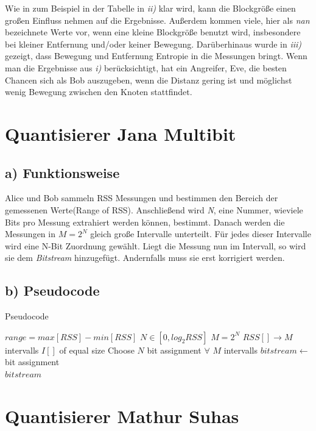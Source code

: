 \documentclass[12pt,a4paper]{article}
\begin{document}
Wie in zum Beispiel in der Tabelle in \textit{ii)} klar wird, kann die 
Blockgröße einen großen Einfluss nehmen auf die Ergebnisse. Außerdem 
kommen viele, hier als \textit{nan} bezeichnete Werte vor, wenn
eine kleine Blockgröße benutzt wird, insbesondere bei kleiner 
Entfernung und/oder keiner Bewegung. 
Darüberhinaus wurde in \textit{iii)} gezeigt, dass Bewegung und
Entfernung Entropie in die Messungen bringt. Wenn man die Ergebnisse
aus \textit{i)} berücksichtigt, hat ein Angreifer, Eve, die besten 
Chancen sich als Bob auszugeben, wenn die Distanz gering ist und 
möglichst wenig Bewegung zwischen den Knoten stattfindet.

\newpage
\section{Quantisierer Jana Multibit}
\subsection*{a) Funktionsweise}
Alice und Bob sammeln RSS Messungen und bestimmen den Bereich der gemessenen Werte(Range of RSS). Anschließend wird \textit{N}, eine Nummer, wieviele Bits pro Messung extrahiert werden können, bestimmt. Danach werden die Messungen in $M = 2^N$ gleich große Intervalle unterteilt. Für jedes dieser Intervalle wird eine N-Bit Zuordnung gewählt. Liegt die Messung nun im Intervall, so wird sie dem \textit{Bitstream} hinzugefügt. Andernfalls muss sie erst korrigiert werden.

\subsection*{b) Pseudocode}
\begin{algorithm}
\caption{Pseudocode}
\begin{algorithmic}[1]
\State $range = max[RSS] - min[RSS]$
\State $N \in [0, log_2 RSS]$
\State $M = 2^N$
\State $RSS[] \to M$ intervalls $I[]$ of equal size
\State Choose $N$ bit assignment $\forall$ $M$ intervalls
\State $bitstream \gets$ bit assignment
\EndIf
\EndFor
\EndFor\\
\Return $bitstream$
\end{algorithmic}
\end{algorithm}

\newpage
\section{Quantisierer Mathur Suhas}
\end{document}
